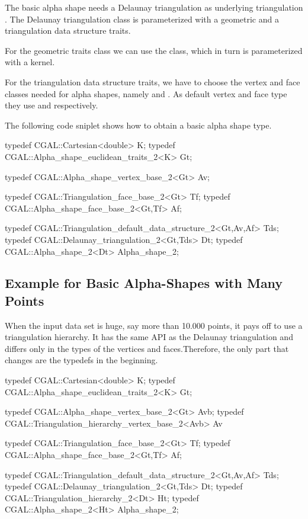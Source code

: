The basic alpha shape needs a Delaunay triangulation as
underlying triangulation .  The Delaunay triangulation class is
parameterized with a geometric and a triangulation data structure traits.

For the geometric traits class we can use the 
class, which in turn is parameterized with a kernel.

For the triangulation data structure traits, we have to
choose the vertex and face classes needed for alpha shapes,
namely  and .
As default vertex and face type they use 
and   respectively. 



The following code sniplet shows how to obtain a basic
alpha shape type.

\begin{cprog}
typedef CGAL::Cartesian<double> K;
typedef CGAL::Alpha_shape_euclidean_traits_2<K> Gt;

typedef CGAL::Alpha_shape_vertex_base_2<Gt> Av;

typedef CGAL::Triangulation_face_base_2<Gt> Tf;
typedef CGAL::Alpha_shape_face_base_2<Gt,Tf> Af;

typedef CGAL::Triangulation_default_data_structure_2<Gt,Av,Af> Tds;
typedef CGAL::Delaunay_triangulation_2<Gt,Tds> Dt;
typedef CGAL::Alpha_shape_2<Dt> Alpha_shape_2;
\end{cprog}


\subsection{Example for Basic Alpha-Shapes with Many Points
         \label{I1_SectClassicAS2DHier}}

When the input data set is huge, say more than 10.000 points, it pays
off to use a triangulation hierarchy. It has the same API as the
Delaunay triangulation and differs only in the types of the vertices
and faces.Therefore, the only part that changes are the typedefs in the beginning.

\begin{cprog}
typedef CGAL::Cartesian<double> K;
typedef CGAL::Alpha_shape_euclidean_traits_2<K> Gt;

typedef CGAL::Alpha_shape_vertex_base_2<Gt> Avb;
typedef CGAL::Triangulation_hierarchy_vertex_base_2<Avb> Av 

typedef CGAL::Triangulation_face_base_2<Gt> Tf;
typedef CGAL::Alpha_shape_face_base_2<Gt,Tf> Af;

typedef CGAL::Triangulation_default_data_structure_2<Gt,Av,Af> Tds;
typedef CGAL::Delaunay_triangulation_2<Gt,Tds> Dt;
typedef CGAL::Triangulation_hierarchy_2<Dt> Ht;
typedef CGAL::Alpha_shape_2<Ht> Alpha_shape_2;
\end{cprog}


